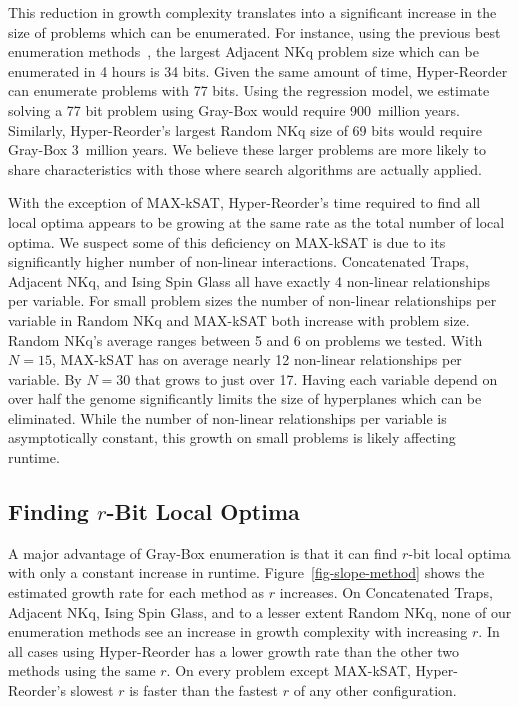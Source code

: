 \documentclass[runningheads,a4paper]{llncs}
\begin{document}
This reduction in growth complexity translates into a significant increase in the size of problems
which can be enumerated. For instance, using the previous best enumeration methods~\cite{ochoa:2015:crossovernetworks},
the largest Adjacent NKq problem size which can be enumerated in 4 hours is 34 bits. Given the same amount of time,
Hyper-Reorder can enumerate problems with 77 bits. Using the regression model, we estimate solving
a 77 bit problem using Gray-Box would require 900~million years. Similarly, Hyper-Reorder's largest
Random NKq size of 69 bits would require Gray-Box 3~million years. We believe these larger problems
are more likely to share characteristics with those where search algorithms are actually applied.

With the exception of MAX-kSAT, Hyper-Reorder's time required to find all local optima
appears to be growing at the same rate as the total number of local optima. We suspect
some of this deficiency on MAX-kSAT is due to its significantly higher number of non-linear
interactions. Concatenated Traps, Adjacent NKq, and Ising Spin Glass all have exactly 4
non-linear relationships per variable. For small problem sizes
the number of non-linear relationships per variable in
Random NKq and MAX-kSAT both increase with problem
size. Random NKq's average ranges between 5 and 6 on problems we tested.
With $N=15$, MAX-kSAT has on average nearly
12 non-linear relationships per variable. By $N=30$ that grows to just over 17. Having each
variable depend on over half the genome significantly limits the size of hyperplanes which
can be eliminated. While the number of non-linear relationships per variable
is asymptotically constant, this growth on small problems is likely affecting runtime.


\subsection{Finding $r$-Bit Local Optima}
\label{sec-r-bit}
A major advantage of Gray-Box enumeration is that it can find $r$-bit local optima
with only a constant increase in runtime. Figure~\ref{fig-slope-method}
shows the estimated growth rate for each method as $r$ increases. On Concatenated Traps,
Adjacent NKq, Ising Spin Glass, and to a lesser extent Random NKq, none of our enumeration
methods see an increase in growth complexity with increasing $r$. In all cases using Hyper-Reorder
has a lower growth rate than the other two methods using the same $r$. On every problem
except MAX-kSAT, Hyper-Reorder's slowest $r$ is faster than the fastest $r$
of any other configuration.
\end{document}
